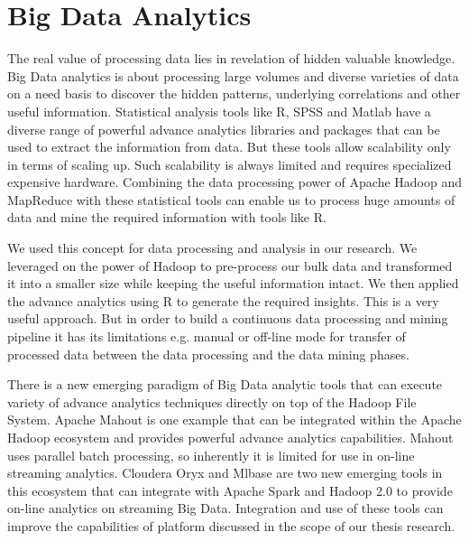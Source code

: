 \section{Big Data Analytics}
The real value of processing data lies in revelation of hidden valuable knowledge. Big Data analytics is about processing large volumes and diverse varieties of data on a need basis to discover the hidden patterns, underlying correlations and other useful information. Statistical analysis tools like R, SPSS and Matlab have a diverse range of powerful advance analytics libraries and packages that can be used to extract the information from data. But these tools allow scalability only in terms of scaling up. Such scalability is always limited and requires specialized expensive hardware. Combining the data processing power of Apache Hadoop and MapReduce with these statistical tools can enable us to process huge amounts of data and mine the required information with tools like R.

We used this concept for data processing and analysis in our research. We leveraged on the power of Hadoop to pre-process our bulk data and transformed it into a smaller size while keeping the useful information intact. We then applied the advance analytics using R to generate the required insights. This is a very useful approach. But in order to build a continuous data processing and mining pipeline it has its limitations e.g. manual or off-line mode for transfer of processed data between the data processing and the data mining phases. 

There is a new emerging paradigm of Big Data analytic tools that can execute variety of advance analytics techniques directly on top of the Hadoop File System. Apache Mahout is one example that can be integrated within the Apache Hadoop ecosystem and provides powerful advance analytics capabilities. Mahout uses parallel batch processing, so inherently it is limited for use in on-line streaming analytics. Cloudera Oryx and Mlbase are two new emerging tools in this ecosystem that can integrate with Apache Spark and Hadoop 2.0 to provide on-line analytics on streaming Big Data. Integration and use of these tools can improve the capabilities of platform discussed in the scope of our thesis research.     

